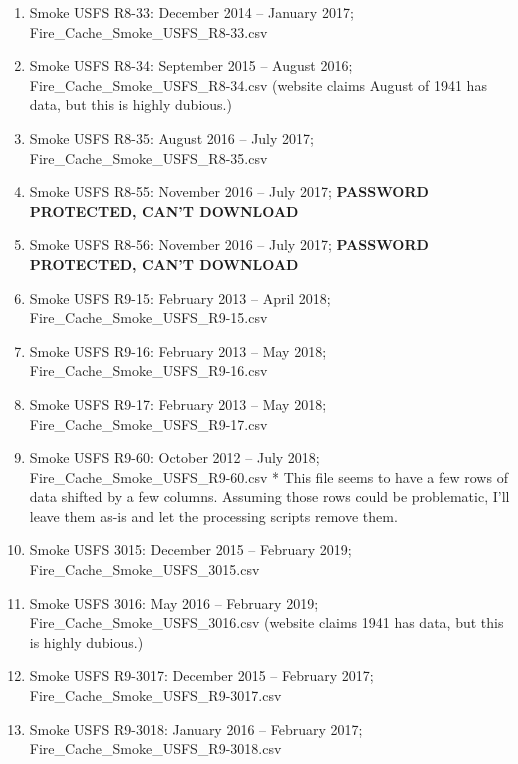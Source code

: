 \begin{enumerate}
\begin{enumerate}[nolistsep]
\item Smoke USFS R8-33: December 2014 -- January 2017; Fire\_Cache\_Smoke\_USFS\_R8-33.csv
\item Smoke USFS R8-34: September 2015 -- August 2016; Fire\_Cache\_Smoke\_USFS\_R8-34.csv (website claims August of 1941 has data, but this is highly dubious.)
\item Smoke USFS R8-35: August 2016 -- July 2017; Fire\_Cache\_Smoke\_USFS\_R8-35.csv
\item Smoke USFS R8-55: November 2016 -- July 2017; \textbf{PASSWORD PROTECTED, CAN'T DOWNLOAD}
\item Smoke USFS R8-56: November 2016 -- July 2017; \textbf{PASSWORD PROTECTED, CAN'T DOWNLOAD}
\item Smoke USFS R9-15: February 2013 -- April 2018;  Fire\_Cache\_Smoke\_USFS\_R9-15.csv
\item Smoke USFS R9-16: February 2013 -- May 2018; Fire\_Cache\_Smoke\_USFS\_R9-16.csv
\item Smoke USFS R9-17: February 2013 -- May 2018; Fire\_Cache\_Smoke\_USFS\_R9-17.csv
\item Smoke USFS R9-60: October 2012 -- July 2018; Fire\_Cache\_Smoke\_USFS\_R9-60.csv * This file seems to have a few rows of data shifted by a few columns. Assuming those rows could be problematic, I'll leave them as-is and let the processing scripts remove them.
\item Smoke USFS 3015: December 2015 -- February 2019; Fire\_Cache\_Smoke\_USFS\_3015.csv
\item Smoke USFS 3016: May 2016 -- February 2019; Fire\_Cache\_Smoke\_USFS\_3016.csv (website claims 1941 has data, but this is highly dubious.)
\item Smoke USFS R9-3017: December 2015 -- February 2017; Fire\_Cache\_Smoke\_USFS\_R9-3017.csv
\item Smoke USFS R9-3018: January 2016 -- February 2017; Fire\_Cache\_Smoke\_USFS\_R9-3018.csv

\end{enumerate}


\end{enumerate}
